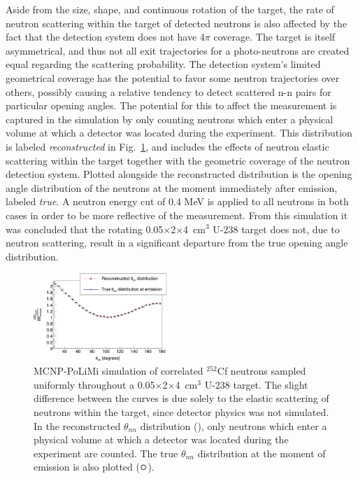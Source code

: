 \documentclass[%
 reprint,
 amsmath,amssymb,
 aps,
 nofootinbib
]{revtex4-1}
\begin{document}
Aside from the size, shape, and continuous rotation of the target, the rate of neutron scattering within the target of detected neutrons is also affected by the fact that the detection system does not have 4$\pi$ coverage.
The target is itself asymmetrical, and thus not all exit trajectories for a photo-neutrons are created equal regarding the scattering probability.
The detection system's limited geometrical coverage has the potential to favor some neutron trajectories over others, possibly causing a relative tendency to detect scattered n-n pairs for particular opening angles.
The potential for this to affect the measurement is captured in the simulation by only counting neutrons which enter a physical volume at which a detector was located during the experiment.
This distribution is labeled \emph{reconstructed} in Fig.~\ref{fig:ElasticScatteringEffect}, and includes the effects of neutron elastic scattering within the target together with the geometric coverage of the neutron detection system.
Plotted alongside the reconstructed distribution is the opening angle distribution of the neutrons at the moment immediately after emission, labeled \emph{true}.
A neutron energy cut of 0.4 MeV is applied to all neutrons in both cases in order to be more reflective of the measurement.
From this simulation it was concluded that the rotating 0.05$\times$2$\times$4~cm$^3$ U-238 target does not, due to neutron scattering, result in a significant departure from the true opening angle distribution.
\begin{figure}
    \centering
    \includegraphics[width = 0.45\textwidth]{EffectOfElasticScattering.png}
    \caption{
    MCNP-PoLiMi simulation of correlated $^{252}$Cf neutrons sampled uniformly throughout a 0.05$\times$2$\times$4~cm$^3$ U-238 target.
    The slight difference between the curves is due solely to the elastic scattering of neutrons within the target, since detector physics was not simulated.
    In the reconstructed $\theta_{nn}$ distribution ({\tiny {}}), only neutrons which enter a physical volume at which a detector was located during the experiment are counted.
   The true $\theta_{nn}$ distribution at the moment of emission is also plotted ($\mathlarger{\mathlarger{\mathlarger{\circ}}}$).
    }
    \label{fig:ElasticScatteringEffect}
\end{figure}
\end{document}
